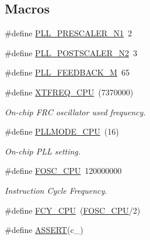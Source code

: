 \subsection*{Macros}
\begin{DoxyCompactItemize}
\item 
\#define \hyperlink{a00072_a512a7743d94a6335ddd824498dc56df7}{P\+L\+L\+\_\+\+P\+R\+E\+S\+C\+A\+L\+E\+R\+\_\+\+N1}~2
\item 
\#define \hyperlink{a00072_a39c4650028eea85070da15dc0a967d8a}{P\+L\+L\+\_\+\+P\+O\+S\+T\+S\+C\+A\+L\+E\+R\+\_\+\+N2}~3
\item 
\#define \hyperlink{a00072_a616f73024087cf3c328cde290113065a}{P\+L\+L\+\_\+\+F\+E\+E\+D\+B\+A\+C\+K\+\_\+\+M}~65
\item 
\#define \hyperlink{a00072_a719092b960b832b468fd401ed27b9003}{X\+T\+F\+R\+E\+Q\+\_\+\+C\+P\+U}~(7370000)
\begin{DoxyCompactList}\small\item\em On-\/chip F\+R\+C oscillator used frequency. \end{DoxyCompactList}\item 
\#define \hyperlink{a00072_a0d6b8c656533d3c815daa9d575998950}{P\+L\+L\+M\+O\+D\+E\+\_\+\+C\+P\+U}~(16)
\begin{DoxyCompactList}\small\item\em On-\/chip P\+L\+L setting. \end{DoxyCompactList}\item 
\#define \hyperlink{a00072_a64b7f2fd4683ad3dcd74ccab1eba40d7}{F\+O\+S\+C\+\_\+\+C\+P\+U}~120000000
\begin{DoxyCompactList}\small\item\em Instruction Cycle Frequency. \end{DoxyCompactList}\item 
\#define \hyperlink{a00072_a573f918b7668f8f2b59ac8adeae633a4}{F\+C\+Y\+\_\+\+C\+P\+U}~(\hyperlink{a00072_a64b7f2fd4683ad3dcd74ccab1eba40d7}{F\+O\+S\+C\+\_\+\+C\+P\+U}/2)
\item 
\#define \hyperlink{a00072_abb8ff8e213ac9f6fb21d2b968583b936}{A\+S\+S\+E\+R\+T}(c\+\_\+)
\end{DoxyCompactItemize}
